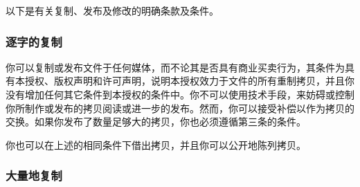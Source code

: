 以下是有关复制、发布及修改的明确条款及条件。


\subsubsection{逐字的复制}


你可以复制或发布文件于任何媒体，而不论其是否具有商业买卖行为，其条件为具有本授权、版权声明和许可声明，说明本授权效力于文件的所有重制拷贝，并且你没有增加任何其它条件到本授权的条件中。你不可以使用技术手段，来妨碍或控制你所制作或发布的拷贝阅读或进一步的发布。然而，你可以接受补偿以作为拷贝的交换。如果你发布了数量足够大的拷贝，你也必须遵循第三条的条件。


你也可以在上述的相同条件下借出拷贝，并且你可以公开地陈列拷贝。


\subsubsection{大量地复制}


